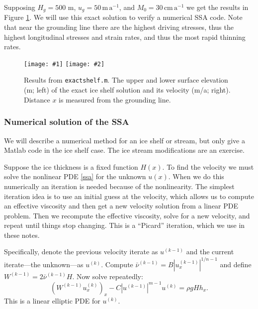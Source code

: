 \documentclass[titlepage,letterpaper,final,12pt]{scrartcl}
\newcommand{\twofigsizes}[5]{
\begin{figure}[ht]
\centering
\texttt{[image: \#1]} \quad
\texttt{[image: \#2]}
\caption{#3}
\label{fig:#1}
\end{figure}}
\newcommand{\twofig}[3]{\twofigsizes{#1}{#2}{#3}{2.5in}{2.5in}}
\begin{document}
Supposing $H_g=500$ m, $u_g = 50 \,\text{m}\,\text{a}^{-1}$, and $M_0=30 \,\text{cm}\,\text{a}^{-1}$ we get the results in Figure \ref{fig:steadyshelfprofile}.  We will use this exact solution to verify a numerical SSA code.  Note that near the grounding line there are the highest driving stresses, thus the highest longitudinal stresses and strain rates, and thus the most rapid thinning rates.

\twofig{steadyshelfprofile}{steadyshelfvelocity}{Results from \texttt{exactshelf.m}.  The upper and lower surface elevation (m; left) of the exact ice shelf solution and its velocity (m/a; right).  Distance $x$ is measured from the grounding line.}

\subsubsection*{Numerical solution of the SSA}  We will describe a numerical method for an ice shelf or stream, but only give a Matlab code in the ice shelf case.  The ice stream modifications are an exercise.

Suppose the ice thickness is a fixed function $H(x)$.  To find the velocity we must solve the nonlinear PDE \eqref{ssa} for the unknown $u(x)$.  When we do this numerically an iteration is needed because of the nonlinearity.  The simplest iteration idea is to use an initial guess at the velocity, which allows us to compute an effective viscosity and then get a new velocity solution from a linear PDE problem.  Then we recompute the effective viscosity, solve for a new velocity, and repeat until things stop changing.  This is a ``Picard'' iteration, which we use in these notes.

Specifically, denote the previous velocity iterate as $u^{(k-1)}$ and the current iterate---the unknown---as $u^{(k)}$.  Compute $\bar \nu^{(k-1)} = B |u^{(k-1)}_x|^{1/n-1}$ and define $W^{(k-1)} = 2 \bar \nu^{(k-1)} H$.  Now solve repeatedly:
\begin{equation}
   \left(W^{(k-1)} u^{(k)}_x\right)_x - C |u^{(k-1)}|^{m-1} u^{(k)} = \rho g H h_x. \label{picardssa}
\end{equation}
This is a linear elliptic PDE for $u^{(k)}$.
\end{document}
